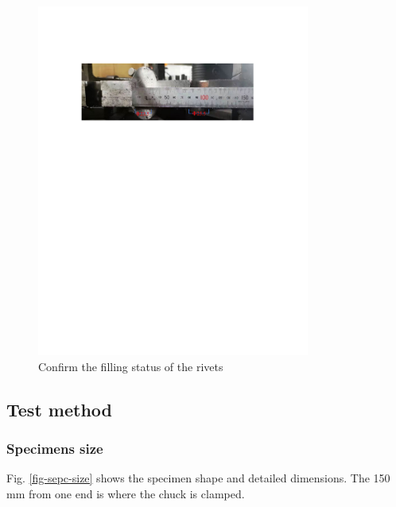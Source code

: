 \begin{figure}[htbp]
    \centering
    \includegraphics[width=0.8\textwidth]{imgs/ch3/ch3beasta.pdf}
    \caption{Confirm the filling status of the rivets}
    \label{fig-ch3beasta}
\end{figure}


\subsection{Test method}

\subsubsection{Specimens size}

Fig. \ref{fig-sepc-size} shows the specimen shape and detailed dimensions. The 150 mm from one end is where the chuck is clamped.


